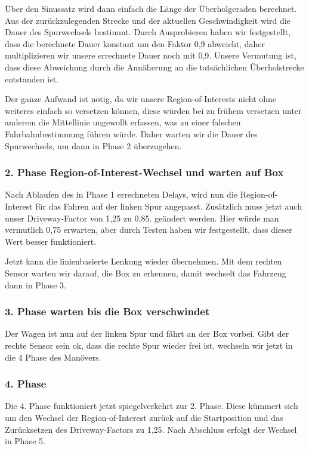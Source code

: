 Über den Sinussatz wird dann einfach die Länge der Überholgeraden berechnet. Aus der zurückzulegenden Strecke und der aktuellen Geschwindigkeit wird die Dauer des Spurwechsels bestimmt. Durch Ausprobieren haben wir festgestellt, dass die berechnete Dauer konstant um den Faktor 0,9 abweicht, daher multiplizieren wir unsere errechnete Dauer noch mit 0,9. Unsere Vermutung ist, dass diese Abweichung durch die Annäherung an die tatsächlichen Überholstrecke entstanden ist.

Der ganze Aufwand ist nötig, da wir unsere Region-of-Interests nicht ohne weiteres einfach so versetzen können, diese würden bei zu frühem versetzen unter anderem die Mittellinie ungewollt erfassen, was zu einer falschen Fahrbahnbestimmung führen würde. Daher warten wir die Dauer des Spurwechsels, um dann in Phase 2 überzugehen.

\subsubsection{2. Phase Region-of-Interest-Wechsel und warten auf Box}
Nach Ablaufen des in Phase 1 errechneten Delays, wird nun die Region-of-Interest für das Fahren auf der linken Spur angepasst. Zusätzlich muss jetzt auch unser Driveway-Factor von 1,25 zu 0,85. geändert werden. Hier würde man vermutlich 0,75 erwarten, aber durch Testen haben wir festgestellt, dass dieser Wert besser funktioniert.

Jetzt kann die linienbasierte Lenkung wieder übernehmen. Mit dem rechten Sensor warten wir darauf, die Box zu erkennen, damit wechselt das Fahrzeug dann in Phase 3.

\subsubsection{3. Phase warten bis die Box verschwindet}
Der Wagen ist nun auf der linken Spur und fährt an der Box vorbei. Gibt der rechte Sensor sein ok, dass die rechte Spur wieder frei ist, wechseln wir jetzt in die 4 Phase des Manövers.

\subsubsection{4. Phase}
Die 4. Phase funktioniert jetzt spiegelverkehrt zur 2. Phase. Diese kümmert sich um den Wechsel der Region-of-Interest zurück auf die Startposition und das Zurücksetzen des Driveway-Factors zu 1,25. Nach Abschluss erfolgt der Wechsel in Phase 5.

